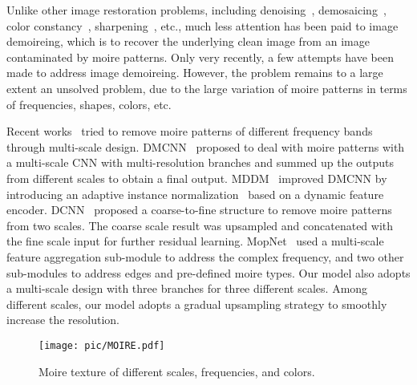 \documentclass[10pt,twocolumn,letterpaper]{article}
\begin{document}
Unlike other image restoration problems, including denoising~\cite{zhang2017beyond}, demosaicing~\cite{DemosaicNet}, color constancy~\cite{FFCC}, sharpening~\cite{romano2016raisr}, etc., much less attention has been paid to image demoireing, which is to recover the underlying clean image from an image contaminated by moire patterns.
Only very recently, a few attempts \cite{sun2018moire, liu2018demoir, gao2019moire, he2019mop} have been made to address image demoireing. However, the problem remains to a large extent an unsolved problem, due to the large variation of moire patterns in terms of frequencies, shapes, colors, etc.

Recent works~\cite{sun2018moire, cheng2019multi, he2019mop} tried to remove moire patterns of different frequency bands through multi-scale design. 
DMCNN~\cite{sun2018moire} proposed to deal with moire patterns with a multi-scale CNN with multi-resolution branches and summed up the outputs from different scales to obtain a final output. 
MDDM~\cite{cheng2019multi} improved DMCNN by introducing an adaptive instance normalization~\cite{adain} based on a dynamic feature encoder.
DCNN~\cite{liu2018demoir} proposed a coarse-to-fine structure to remove moire patterns from two scales. The coarse scale result was upsampled and concatenated with the fine scale input for further residual learning.
MopNet~\cite{he2019mop} used a multi-scale feature aggregation sub-module to address the complex frequency, and two other sub-modules to address edges and pre-defined moire types.
Our model also adopts a multi-scale design with three branches for three different scales. Among different scales, our model adopts a gradual upsampling strategy to smoothly increase the resolution. 

\begin{figure}[t]
	\centering
	\texttt{[image: pic/MOIRE.pdf]}
	\caption{Moire texture of different scales, frequencies, and colors.}
	\label{MOIRE}
\end{figure}
\end{document}
